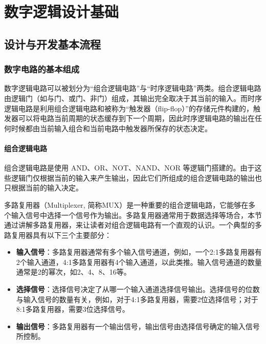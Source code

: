 
\chapter{数字逻辑设计基础}\label{chap:03-digital-logic}

\section{设计与开发基本流程}\label{sec:03-digital-logic-001}

\subsection{数字电路的基本组成}\label{sec:03-digital-logic-002}

数字逻辑电路可以被划分为``组合逻辑电路''与``时序逻辑电路''两类。组合逻辑电路由逻辑门（如与门、或门、非门）组成，其输出完全取决于其当前的输入。而时序逻辑电路是利用组合逻辑电路和被称为``触发器（flip-flop）''的存储元件构建的，触发器可以将电路当前周期的状态缓存到下一个周期，因此时序逻辑电路的输出在任何时候都由当前输入组合和当前电路中触发器所保存的状态决定。

\subsubsection{组合逻辑电路}\label{sec:03-digital-logic-003}

组合逻辑电路是使用 AND、OR、NOT、NAND、NOR 等逻辑门搭建的。由于这些逻辑门仅根据当前的输入来产生输出，因此它们所组成的组合逻辑电路的输出也只根据当前的输入决定。

多路复用器（Multiplexer, 简称MUX）是一种重要的组合逻辑电路，它能够在多个输入信号中选择一个信号作为输出。多路复用器通常用于数据选择等场合，本节通过讲解多路复用器，来让读者对组合逻辑电路有一个直观的认识。一个典型的多路复用器具有以下三个主要部分：

\begin{itemize}
\item
  \textbf{输入信号}：多路复用器通常有多个输入信号通道，例如，一个2:1多路复用器有2个输入通道，4:1多路复用器有4个输入通道，以此类推。输入信号通道的数量通常是2的幂次，如2、4、8、16等。
\item
  \textbf{选择信号}：选择信号决定了从哪一个输入通道选择信号输出。选择信号的位数与输入信号的数量有关，例如，对于4:1多路复用器，需要2位选择信号；对于8:1多路复用器，需要3位选择信号。
\item
  \textbf{输出信号}：多路复用器有一个输出信号，输出信号由选择信号确定的输入信号所控制。
\end{itemize}

